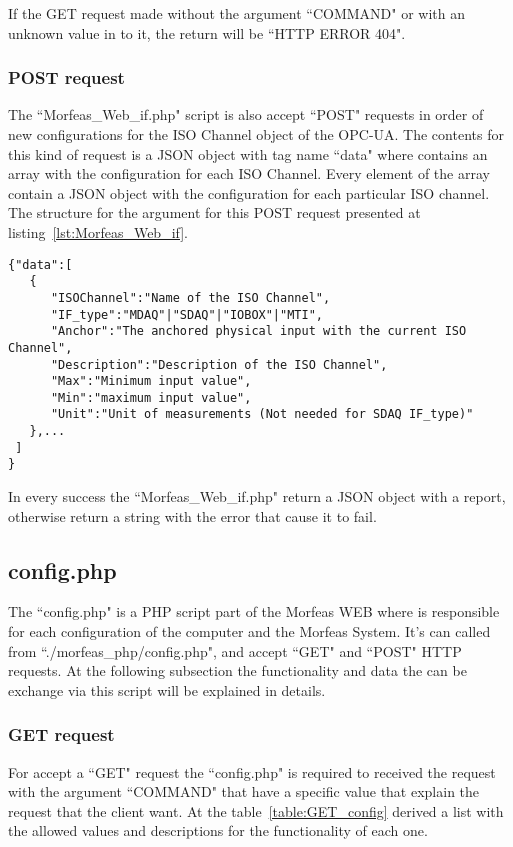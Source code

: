 If the GET request made without the argument ``COMMAND" or with an unknown value in to it, the return will be ``HTTP ERROR 404".

\subsubsection{POST request}
The ``Morfeas\_Web\_if.php" script is also accept ``POST" requests in order of new configurations for the ISO Channel object of the OPC-UA.
The contents for this kind of request is a JSON object with tag name ``data" where contains an array with the configuration for each ISO Channel.
Every element of the array contain a JSON object with the configuration for each particular ISO channel. The structure for the argument for this POST request
presented at listing~\ref{lst:Morfeas_Web_if}.

\begin{lstlisting}[frame=single,caption=Example for argument of POST request for Morfeas\_Web\_if.php,label=lst:Morfeas_Web_if]
{"data":[
   {
      "ISOChannel":"Name of the ISO Channel",
      "IF_type":"MDAQ"|"SDAQ"|"IOBOX"|"MTI",
      "Anchor":"The anchored physical input with the current ISO Channel",
      "Description":"Description of the ISO Channel",
      "Max":"Minimum input value",
      "Min":"maximum input value",
      "Unit":"Unit of measurements (Not needed for SDAQ IF_type)"
   },...
 ]
}
\end{lstlisting}

In every success the ``Morfeas\_Web\_if.php" return a JSON object with a report, otherwise return a string with the error that cause it to fail.

\subsection{config.php}
The ``config.php" is a PHP script part of the Morfeas WEB where is responsible for each configuration of the computer and the Morfeas System. It's can called from ``./morfeas\_php/config.php",
and accept ``GET" and ``POST" HTTP requests. At the following subsection the functionality and data the can be exchange via this script will be explained in details.

\subsubsection{GET request}
For accept a ``GET" request the ``config.php" is required to received the request with the argument ``COMMAND" that have a specific value that explain the request that the client want.
At the table~\ref{table:GET_config} derived a list with the allowed values and descriptions for the functionality of each one.


